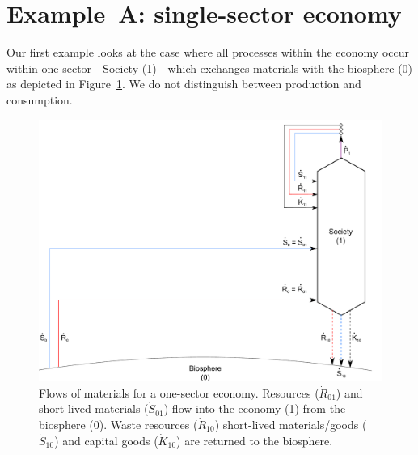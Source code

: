 \section{Example~A: single-sector economy} %
\label{sec:A_materials}

Our first example looks at the case where all processes within the economy occur within
one sector---Society (1)---which exchanges materials with the biosphere (0) as depicted in
Figure~\ref{fig:A_materials}.  We do not distinguish between production and consumption.

\begin{figure}[!ht]
\centering{}
\includegraphics[width=0.8\linewidth]{Part_1/Chapter_Materials/images/1_sector_materials.pdf}
\caption[Flows of materials for a one-sector economy]{Flows of materials 
for a one-sector economy. 
Resources ($\dot{R}_{01}$) and short-lived materials 
($\dot{S}_{01}$) flow into the economy (1) 
from the biosphere (0). Waste resources 
($\dot{R}_{10}$) short-lived materials/goods 
($\dot{S}_{10}$) and capital goods 
($\dot{K}_{10}$) are returned to the biosphere.}
\label{fig:A_materials}
\end{figure}

